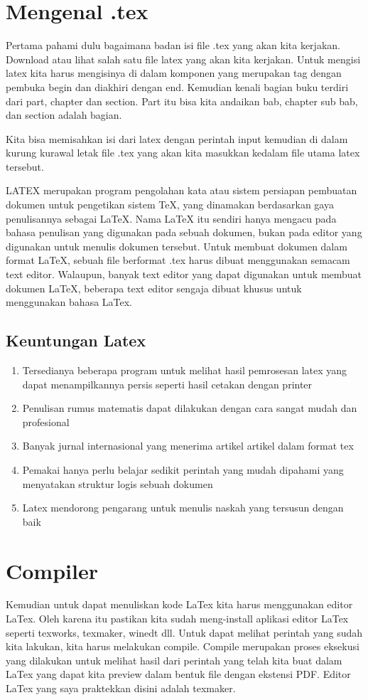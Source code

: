 \section{Mengenal .tex}
Pertama pahami dulu bagaimana badan isi file .tex yang akan kita kerjakan. Download atau lihat salah satu file latex yang akan kita kerjakan. Untuk mengisi latex kita harus mengisinya di dalam komponen  yang merupakan tag dengan pembuka begin dan diakhiri dengan end.
Kemudian kenali bagian buku terdiri dari part, chapter dan section. Part itu bisa kita andaikan bab, chapter sub bab, dan section adalah bagian.

Kita bisa memisahkan isi dari latex dengan perintah input kemudian di dalam kurung kurawal letak file .tex yang akan kita masukkan kedalam file utama latex tersebut.

LATEX merupakan program pengolahan kata atau sistem persiapan pembuatan dokumen untuk pengetikan sistem TeX, yang dinamakan berdasarkan gaya penulisannya sebagai LaTeX. Nama LaTeX itu sendiri hanya mengacu pada bahasa penulisan yang digunakan pada sebuah dokumen, bukan pada editor yang digunakan untuk menulis dokumen tersebut. Untuk membuat dokumen dalam format LaTeX, sebuah file berformat .tex harus dibuat menggunakan semacam text editor. Walaupun, banyak text editor yang dapat digunakan untuk membuat dokumen LaTeX, beberapa text editor sengaja dibuat khusus untuk menggunakan bahasa LaTex.
\subsection{Keuntungan Latex}
\begin{enumerate}
  \item Tersedianya beberapa program untuk melihat hasil pemrosesan latex yang dapat menampilkannya persis seperti hasil cetakan dengan printer
  \item Penulisan rumus matematis dapat dilakukan dengan cara sangat mudah dan profesional
  \item Banyak jurnal internasional yang menerima artikel artikel dalam format tex
  \item Pemakai hanya perlu belajar sedikit perintah yang mudah dipahami yang menyatakan struktur logis sebuah dokumen
  \item Latex mendorong pengarang untuk menulis naskah yang tersusun dengan baik
\end{enumerate}

\section{Compiler}
Kemudian untuk dapat menuliskan kode LaTex kita harus menggunakan editor LaTex. Oleh karena itu pastikan kita sudah meng-install aplikasi editor LaTex seperti texworks, texmaker, winedt dll. Untuk dapat melihat perintah yang sudah kita lakukan, kita harus melakukan compile. Compile merupakan proses eksekusi yang dilakukan untuk melihat hasil dari perintah yang telah kita buat dalam LaTex yang dapat kita preview dalam bentuk file dengan ekstensi PDF. Editor LaTex yang saya praktekkan disini adalah texmaker.


